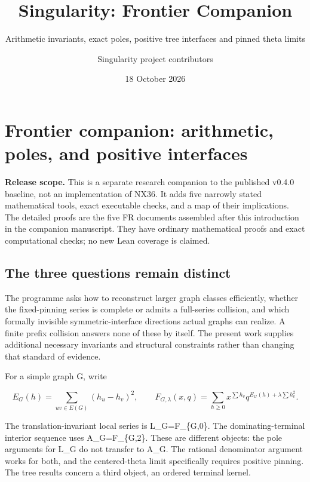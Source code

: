 \documentclass[
  11pt,
  a4paper,
]{report}
\title{Singularity: Frontier Companion}
\subtitle{Arithmetic invariants, exact poles, positive tree interfaces
and pinned theta limits}
\author{Singularity project contributors}
\date{18 October 2026}
\begin{document}
\maketitle

{
\setcounter{tocdepth}{1}
\tableofcontents
}
\hypertarget{frontier-companion-arithmetic-poles-and-positive-interfaces}{%
\chapter{Frontier companion: arithmetic, poles, and positive
interfaces}\label{frontier-companion-arithmetic-poles-and-positive-interfaces}}

\textbf{Release scope.} This is a separate research companion to the
published v0.4.0 baseline, not an implementation of NX36. It adds five
narrowly stated mathematical tools, exact executable checks, and a map
of their implications. The detailed proofs are the five FR documents
assembled after this introduction in the companion manuscript. They have
ordinary mathematical proofs and exact computational checks; no new Lean
coverage is claimed.

\hypertarget{the-three-questions-remain-distinct}{%
\section{The three questions remain
distinct}\label{the-three-questions-remain-distinct}}

The programme asks how to reconstruct larger graph classes efficiently,
whether the fixed-pinning series is complete or admits a full-series
collision, and which formally invisible symmetric-interface directions
actual graphs can realize. A finite prefix collision answers none of
these by itself. The present work supplies additional necessary
invariants and structural constraints rather than changing that standard
of evidence.

For a simple graph G, write

\[
 E_G(h)=\sum_{uv\in E(G)}(h_u-h_v)^2,\qquad
 F_{G,\lambda}(x,q)=\sum_{h\ge0}x^{\sum h_v}
 q^{E_G(h)+\lambda\sum h_v^2}.
\]

The translation-invariant local series is L\_G=F\_\{G,0\}. The
dominating-terminal interior sequence uses A\_G=F\_\{G,2\}. These are
different objects: the pole arguments for L\_G do not transfer to A\_G.
The rational denominator argument works for both, and the centered-theta
limit specifically requires positive pinning. The tree results concern a
third object, an ordered terminal kernel.
\end{document}
